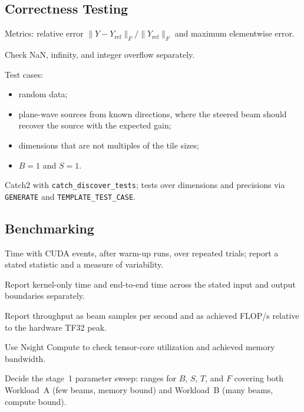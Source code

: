 \documentclass[10pt,letterpaper]{article}
\begin{document}
\subsection*{Correctness Testing}
\begin{todo}
  \item Metrics: relative error $\lVert Y - Y_{\mathrm{ref}} \rVert_F / \lVert Y_{\mathrm{ref}} \rVert_F$ and maximum elementwise error.
  \item Check NaN, infinity, and integer overflow separately.
  \item Test cases:
  \begin{itemize}
    \item random data;
    \item plane-wave sources from known directions, where the steered beam should recover the source with the expected gain;
    \item dimensions that are not multiples of the tile sizes;
    \item $B = 1$ and $S = 1$.
  \end{itemize}
  \item Catch2 with \texttt{catch\_discover\_tests}; tests over dimensions and precisions via \texttt{GENERATE} and \texttt{TEMPLATE\_TEST\_CASE}.
\end{todo}

\subsection*{Benchmarking}
\begin{todo}
  \item Time with CUDA events, after warm-up runs, over repeated trials; report a stated statistic and a measure of variability.
  \item Report kernel-only time and end-to-end time across the stated input and output boundaries separately.
  \item Report throughput as beam samples per second and as achieved FLOP/s relative to the hardware TF32 peak.
  \item Use Nsight Compute to check tensor-core utilization and achieved memory bandwidth.
  \item Decide the stage~1 parameter sweep: ranges for $B$, $S$, $T$, and $F$ covering both Workload~A (few beams, memory bound) and Workload~B (many beams, compute bound).
\end{todo}
\end{document}
